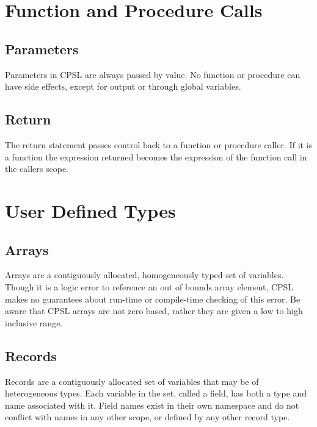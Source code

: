 \documentclass{book}
\begin{document}
\section{Function and Procedure Calls}
\subsection{Parameters}
Parameters in CPSL are always passed by value.
No function or procedure can have side effects, except for output or through global variables.
\subsection{Return}
The return statement passes control back to a function or procedure caller.  If it is a function the expression returned becomes the expression of the function call in the callers scope.
\section{User Defined Types}
\subsection{Arrays}
Arrays are a contiguously allocated, homogeneously typed set of variables.
Though it is a logic error to reference an out of bounds array element, CPSL makes no guarantees about run-time or compile-time checking of this error.
Be aware that CPSL arrays are not zero based, rather they are given a low to high inclusive range.
\subsection{Records}
Records are a contiguously allocated set of variables that may be of heterogeneous types.  Each variable in the set, called a field, has both a type and name associated with it.  Field names exist in their own namespace and do not conflict with names in any other scope, or defined by any other record type.
\end{document}
